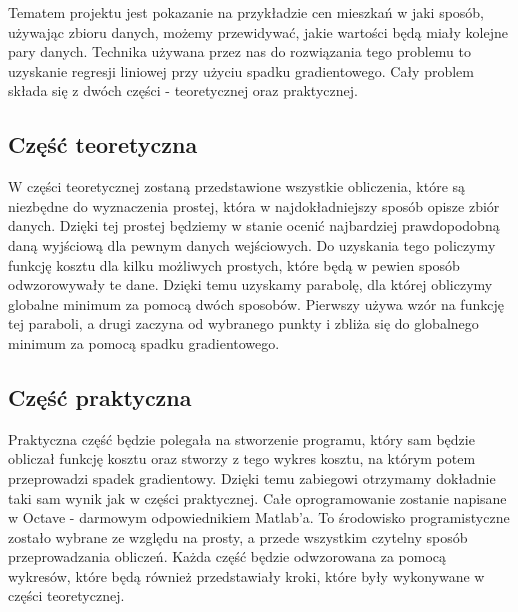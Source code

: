 Tematem projektu jest pokazanie na przykładzie cen mieszkań w jaki sposób, używając zbioru danych, możemy przewidywać, jakie wartości będą miały kolejne pary danych. Technika używana przez nas do rozwiązania tego problemu to uzyskanie regresji liniowej przy użyciu spadku gradientowego. Cały problem składa się z dwóch części - teoretycznej oraz praktycznej.
	\subsection{Część teoretyczna}
W części teoretycznej zostaną przedstawione wszystkie obliczenia, które są niezbędne do wyznaczenia prostej, która w najdokładniejszy sposób opisze zbiór danych. Dzięki tej prostej będziemy w stanie ocenić najbardziej prawdopodobną daną wyjściową dla pewnym danych wejściowych. Do uzyskania tego policzymy funkcję kosztu dla kilku możliwych prostych, które będą w pewien sposób odwzorowywały te dane. Dzięki temu uzyskamy parabolę, dla której obliczymy globalne minimum za pomocą dwóch sposobów. Pierwszy używa wzór na funkcję tej paraboli, a drugi zaczyna od wybranego punkty i zbliża się do globalnego minimum za pomocą spadku gradientowego. 
	\subsection{Część praktyczna}
Praktyczna część będzie polegała na stworzenie programu, który sam będzie obliczał funkcję kosztu oraz stworzy z tego wykres kosztu, na którym potem przeprowadzi spadek gradientowy. Dzięki temu zabiegowi otrzymamy dokładnie taki sam wynik jak w części praktycznej. Całe oprogramowanie zostanie napisane w Octave - darmowym odpowiednikiem Matlab'a. To środowisko programistyczne zostało wybrane ze względu na prosty, a przede wszystkim czytelny sposób przeprowadzania obliczeń. Każda część będzie odwzorowana za pomocą wykresów, które będą również przedstawiały kroki, które były wykonywane w części teoretycznej.